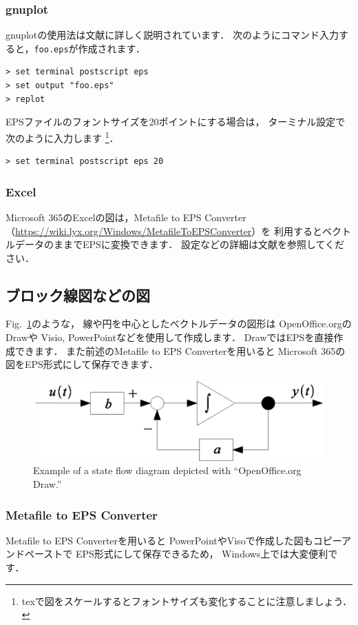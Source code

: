 \documentclass[twocolumn]{jsarticle}
\begin{document}
\subsubsection{gnuplot}
gnuplotの使用法は文献\cite{GnuplotPerfect,GnuplotTP}に詳しく説明されています．
次のようにコマンド入力すると，\texttt{foo.eps}が作成されます．
\begin{verbatim}
> set terminal postscript eps
> set output "foo.eps"
> replot
\end{verbatim}
EPSファイルのフォントサイズを20ポイントにする場合は，
ターミナル設定で次のように入力します
\footnote{texで図をスケールするとフォントサイズも変化することに注意しましょう．}．
\begin{verbatim}
> set terminal postscript eps 20
\end{verbatim}

\subsubsection{Excel}
Microsoft 365のExcelの図は，Metafile to EPS Converter
（\url{https://wiki.lyx.org/Windows/MetafileToEPSConverter}）を
利用するとベクトルデータのままでEPSに変換できます．
設定などの詳細は文献\cite{Metafile2EPSConverter}を参照してください．

\subsection{ブロック線図などの図}
Fig.~\ref{fig:block}のような，
線や円を中心としたベクトルデータの図形は
OpenOffice.orgのDrawや
Visio, PowerPointなどを使用して作成します．
DrawではEPSを直接作成できます．
また前述のMetafile to EPS Converterを用いると
Microsoft 365の図をEPS形式にして保存できます．
% 
\begin{figure}[tb]
  \centering
  \includegraphics[width=0.9\linewidth]{fig/SFDiagram.eps}
  \caption{Example of a state flow diagram depicted with ``OpenOffice.org Draw.''}
  \label{fig:block}
\end{figure}

\subsubsection{Metafile to EPS Converter}
Metafile to EPS Converterを用いると
PowerPointやVisoで作成した図もコピーアンドペーストで
EPS形式にして保存できるため，
Windows上では大変便利です\cite{Metafile2EPSConverter}．
\end{document}

